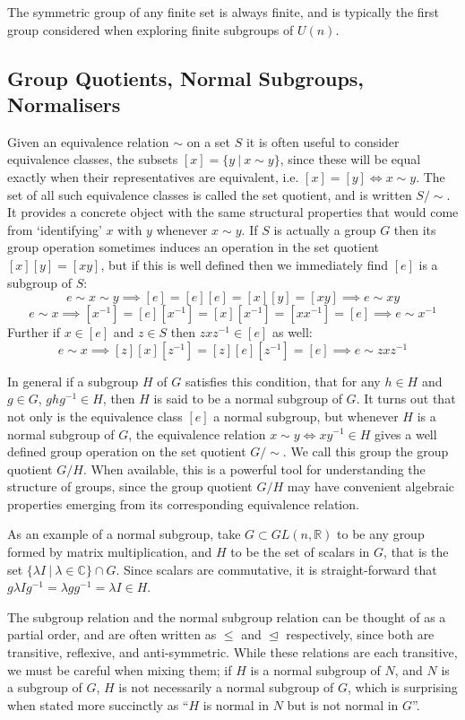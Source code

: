 The symmetric group of any finite set is always finite, and is typically the first group considered when exploring finite subgroups of $U(n)$.
\subsection{Group Quotients, Normal Subgroups, Normalisers}
Given an equivalence relation $\sim$ on a set $S$ it is often useful to consider equivalence classes, the subsets $[x] = \{y\ |\ x \sim y\}$, since these will be equal exactly when their representatives are equivalent, i.e. $[x] = [y] \iff x \sim y$. The set of all such equivalence classes is called the set quotient, and is written $S/\sim$. It provides a concrete object with the same structural properties that would come from `identifying' $x$ with $y$ whenever $x \sim y$. If $S$ is actually a group $G$ then its group operation sometimes induces an operation in the set quotient $[x][y] = [xy]$, but if this is well defined then we immediately find $[e]$ is a subgroup of $S$:
\[e \sim x \sim y \implies [e] = [e][e] = [x][y] = [xy] \implies e \sim xy\]
\[e \sim x \implies [x^{-1}] = [e][x^{-1}] = [x][x^{-1}] = [xx^{-1}] = [e] \implies e \sim x^{-1}\]
Further if $x \in [e]$ and $z \in S$ then $zxz^{-1} \in [e]$ as well:
\[e \sim x \implies [z][x][z^{-1}] = [z][e][z^{-1}] = [e] \implies e \sim zxz^{-1}\]

In general if a subgroup $H$ of $G$ satisfies this condition, that for any $h \in H$ and $g \in G$, $ghg^{-1} \in H$, then $H$ is said to be a normal subgroup of $G$. It turns out that not only is the equivalence class $[e]$ a normal subgroup, but whenever $H$ is a normal subgroup of $G$, the equivalence relation $x \sim y \iff xy^{-1} \in H$ gives a well defined group operation on the set quotient $G/\sim$. We call this group the group quotient $G/H$. When available, this is a powerful tool for understanding the structure of groups, since the group quotient $G/H$ may have convenient algebraic properties emerging from its corresponding equivalence relation.

As an example of a normal subgroup, take $G \subset GL(n, \mathbb{R})$ to be any group formed by matrix multiplication, and $H$ to be the set of scalars in $G$, that is the set $\{\lambda I\ |\ \lambda \in \mathbb{C}\} \cap G$. Since scalars are commutative, it is straight-forward that $g\lambda I g^{-1} = \lambda gg^{-1} = \lambda I \in H$.

The subgroup relation and the normal subgroup relation can be thought of as a partial order, and are often written as $\leq$ and $\trianglelefteq$ respectively, since both are transitive, reflexive, and anti-symmetric. While these relations are each transitive, we must be careful when mixing them; if $H$ is a normal subgroup of $N$, and $N$ is a subgroup of $G$, $H$ is not necessarily a normal subgroup of $G$, which is surprising when stated more succinctly as ``$H$ is normal in $N$ but is not normal in $G$''.

